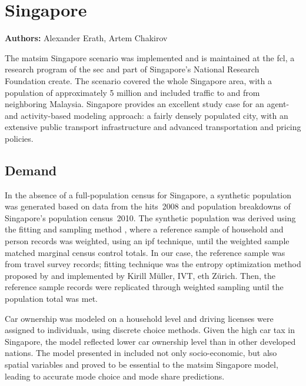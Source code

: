 \section{Singapore}
\label{sec:singapore}
\hfill \textbf{Authors:} Alexander Erath, Artem Chakirov


The \gls{matsim} Singapore scenario \citet[][]{ErathEtAl_TechRep_FCL_forth} was implemented and is maintained at the \gls{fcl}, a research program of the \gls{sec} and part of Singapore's National Research Foundation \gls{create}. The scenario covered the whole Singapore area, with a population of approximately 5 million and included traffic  to and from neighboring Malaysia. Singapore provides an excellent study case for an agent- and activity-based modeling approach: a fairly densely populated city, with an extensive public transport infrastructure and advanced transportation and pricing policies. 

\subsection{Demand}
In the absence of a full-population census for Singapore, a synthetic population was generated based on data from the \gls{hits}~2008 \citep[][]{Choi_JOUR_2010} and population breakdowns of Singapore’s population census~2010. The synthetic population was derived using the fitting and sampling method \citep{MuellerKAxhausen_TRB_2011}, where a reference sample of household and person records was weighted, using an \gls{ipf} technique, until the weighted sample matched marginal census control totals. In our case, the reference sample was from travel survey records; fitting technique was the entropy optimization method proposed by \citet[][]{BarGeraEtAl_TRB_2009} and implemented by Kirill Müller, IVT, \gls{eth} Zürich. Then, the reference sample records were replicated through weighted sampling until the population total was met. 
 
Car ownership was modeled on a household level and driving licenses were assigned to individuals, using discrete choice methods. Given the high car tax in Singapore, the model reflected lower car ownership level than in other developed nations. The model presented in \citet[][]{VanEggermondEtAl_IATBR_2012} included not only socio-economic, but also spatial variables and proved to be essential to the \gls{matsim} Singapore model, leading to accurate mode choice and mode share predictions. 


